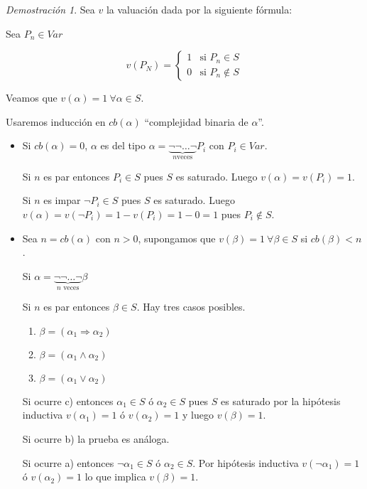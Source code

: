 \documentclass[a4paper,11pt]{article}
\theoremstyle{definition}
\theoremstyle{remark}
\newtheorem*{demo}{Demostración}
\begin{document}
\begin{demo}
	Sea $v$ la valuación dada por la siguiente fórmula: 
	
	Sea $P_n \in Var$
	
	\[
		v(P_N) = \begin{cases}
			1 & \text{si } P_n \in S \\
			0 & \text{si } P_n \not\in S
		\end{cases}
	\]
	
	Veamos que $v(\alpha) = 1\ \forall \alpha \in S$.
	
	Usaremos inducción en $cb(\alpha)$ ``complejidad binaria de $\alpha$''.
	
	\begin{itemize}
		\item Si $cb(\alpha) = 0$, $\alpha$ es del tipo 
		$\alpha = \underbrace{\lnot\lnot\dots\lnot}_{n \text{veces}} P_i$ con $P_i \in Var$.
		
		Si $n$ es par entonces $P_i \in S$ pues $S$ es saturado. Luego $v(\alpha) = v(P_i) = 1$.
		
		Si $n$ es impar $\lnot P_i \in S$ pues $S$ es saturado. Luego $v(\alpha) = 
		v(\lnot P_i) = 1 - v(P_i) = 1 - 0 = 1$ pues $P_i \not\in S$.
		
		\item Sea $n = cb(\alpha)$ con $n > 0$, supongamos que $v(\beta) = 1\ \forall \beta \in S$
		si $cb(\beta) < n$.
		
		Si $\alpha = \underbrace{\lnot\lnot\dots\lnot}_{n\text{ veces}} \beta$
		
		Si $n$ es par entonces $\beta \in S$. Hay tres casos posibles.
		
		\begin{enumerate}[label=\emph{\alph*})]
			\item $\beta = (\alpha_1 \Rightarrow \alpha_2)$

			\item $\beta = (\alpha_1 \wedge \alpha_2)$

			\item $\beta = (\alpha_1 \vee \alpha_2)$
		\end{enumerate}
		
		Si ocurre c) entonces $\alpha_1 \in S$ ó $\alpha_2 \in S$ pues $S$ es saturado
		por la hipótesis inductiva $v(\alpha_1) = 1$ ó $v(\alpha_2) = 1$ y luego $v(\beta) = 1$.
		
		Si ocurre b) la prueba es análoga.
		
		Si ocurre a) entonces $\lnot \alpha_1 \in S$ ó $\alpha_2 \in S$. Por hipótesis inductiva
		$v(\lnot \alpha_1) = 1$ ó $v(\alpha_2) = 1$ lo que implica $v(\beta) = 1$.
		

\end{itemize}
\end{demo}
\end{document}
